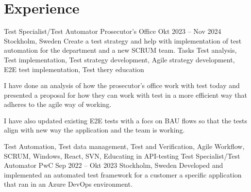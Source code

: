 \documentclass{sobCV}[2015/09/08]
\begin{document}
\section{Experience}
   \experiencenode
   {Test Specialist/Test Automator}
   {Prosecutor's Office}
   {Okt 2023 -- Nov 2024}
   {Stockholm, Sweden}{
       Create a test strategy and help with implementation of test automation
       for the department and a new SCRUM team.
   }
   {Tasks}{
       Test analysis,
       Test implementation,
       Test strategy development,
       Agile strategy development,
       E2E test implementation,
       Test thery education
 }{  %
      {
       I have done an analysis of how the prosecutor's office work with test
       today and presented a proposal for how they can work with test in a more
       efficient way that adheres to the agile way of working.

       I have also updated existing E2E tests with a focs on BAU flows so that
       the tests align with new way the application and the team is working.  

     }
 }{
     Test Automation,
     Test data management,
     Test and Verification,
     Agile Workflow,
     SCRUM,
     Windows,
     React,
     SVN,
     Educating in API-testing
}
\experiencenode
   {Test Specialist/Test Automator}
   {PwC}
   {Sep 2022 -- Okt 2023}
   {Stockholm, Sweden}{
       Developed and implemented an automated test framework for a customer
       a specific application that ran in an Azure DevOps environment.
   }
\end{document}
